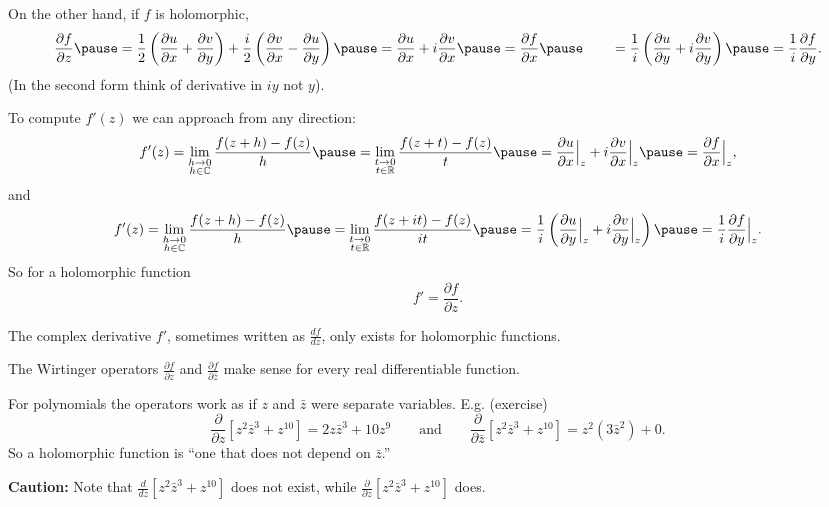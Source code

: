 \documentclass[10pt,aspectratio=169]{beamer}
\begin{document}
\begin{frame}
On the other hand, if $f$ is holomorphic,
\[
\frac{\partial f}{\partial z} 
\pause
=
\frac{1}{2}
\left(
\frac{\partial u}{\partial x} 
+ \frac{\partial v}{\partial y}
\right)
+
\frac{i}{2}
\left( \frac{\partial v}{\partial x} - \frac{\partial u}{\partial y}
\right) 
\pause
=
\frac{\partial u}{\partial x} 
+ i \frac{\partial v}{\partial x}
\pause
 =
\frac{\partial f}{\partial x}
\pause
\qquad
=
\frac{1}{i} \left(
\frac{\partial u}{\partial y}
+ i
\frac{\partial v}{\partial y} 
\right)
\pause
 =
\frac{1}{i}
\frac{\partial f}{\partial y}
.
\]
\pause
(In the second form think of derivative in $iy$ not $y$).

\medskip
\pause

To compute $f'(z)$ we can approach from any direction:
\pause
\[
f'(z) =
\lim_{\substack{h \to 0\\h\in\C}}
\frac{f(z+h)-f(z)}{h}
\pause
=
\lim_{\substack{t \to 0\\t\in\R}}
\frac{f(z+t)-f(z)}{t}
\pause
=
\frac{\partial u}{\partial x} \Big|_z
+ i \frac{\partial v}{\partial x}\Big|_z
\pause
 =
\frac{\partial f}{\partial x} \Big|_z ,
\]
\pause
and
\[
f'(z) =
\lim_{\substack{h \to 0\\h\in\C}}
\frac{f(z+h)-f(z)}{h}
\pause
=
\lim_{\substack{t \to 0\\t\in\R}}
\frac{f(z+it)-f(z)}{it}
\pause
=
\frac{1}{i}
\left(
\frac{\partial u}{\partial y}  \Big|_z
+ i \frac{\partial v}{\partial y} \Big|_z
\right)
\pause
 =
\frac{1}{i}
\frac{\partial f}{\partial y} \Big|_z .
\]
\pause
So for a holomorphic function
\begin{equation*}
f' =
\frac{\partial f}{\partial z} .
\end{equation*}
\end{frame}

\begin{frame}
The complex derivative $f'$, sometimes written as $\frac{df}{dz}$,
only exists for holomorphic functions.

\medskip
\pause

The Wirtinger operators
$\frac{\partial f}{\partial z}$ and
$\frac{\partial f}{\partial \bar{z}}$ make sense for every real differentiable
function.

\medskip
\pause

For polynomials the operators work as if $z$ and $\bar{z}$ were separate
variables.  E.g. (exercise)
\[
\frac{\partial}{\partial z}
\left[ z^2 \bar{z}^3 + z^{10} \right]
=
2z \bar{z}^3 + 10 z^{9}
\qquad
\text{and}
\qquad
\frac{\partial}{\partial \bar{z}}
\left[ z^2 \bar{z}^3 + z^{10} \right]
=
z^2 ( 3 \bar{z}^2 ) + 0 .
\]
\pause
So a holomorphic function is ``one that does not depend on $\bar{z}$.''

\medskip
\pause
\textbf{Caution:}
Note that
$\frac{d}{dz} \left[ z^2 \bar{z}^3 + z^{10} \right]$ does not exist, while
$\frac{\partial}{\partial z} \left[ z^2 \bar{z}^3 + z^{10} \right]$ does.
\end{frame}
\end{document}

